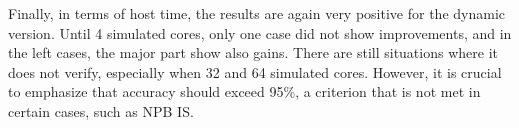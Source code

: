 Finally, in terms of host time, the results are again very positive for the dynamic version. Until 4 simulated cores, only one case did not 
show improvements, and in the left cases, the major part show also gains. There are still situations where it does not verify, 
especially when 32 and 64 simulated cores. However, it is crucial to emphasize that accuracy should exceed 95\%, a criterion that is 
not met in certain cases, such as NPB IS.










